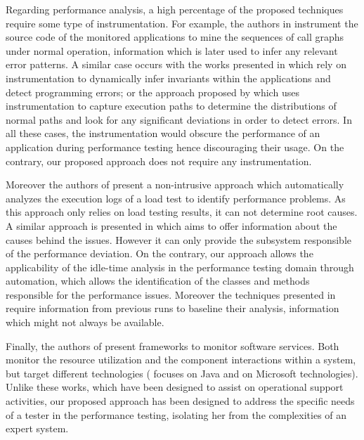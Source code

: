\documentclass[runningheads,a4paper]{llncs}
\begin{document}
Regarding performance analysis, a high percentage of the proposed
techniques require some type of instrumentation. For example, the authors in
\cite{Yang1} instrument the source code of the monitored applications to mine
the sequences of call graphs under normal operation, information which is
later used to infer any relevant error patterns. A similar case occurs with
the works presented in \cite{Hangal1,Csallner1} which rely on instrumentation to dynamically 
infer invariants within the applications and detect programming errors; or the
approach proposed by \cite{Chen2} which uses instrumentation to capture execution paths to determine
the distributions of normal paths and look for any significant deviations in
order to detect errors. In all these cases, the instrumentation would obscure
the performance of an application during performance testing hence discouraging
their usage. On the contrary, our proposed approach does not require any
instrumentation.

Moreover the authors of \cite{Jiang2009} present a non-intrusive approach which
automatically analyzes the execution logs of a load test to identify performance
problems. As this approach only relies on load testing results, it can not
determine root causes. A similar approach is presented in \cite{Malik1} which
aims to offer information about the causes behind the issues. However it can
only provide the subsystem responsible of the performance deviation. On the
contrary, our approach allows the applicability of the idle-time analysis in the
performance testing domain through automation, which allows the identification
of the classes and methods responsible for the performance issues. Moreover the
techniques presented in \cite{Jiang2009,Malik1} require information from previous runs 
to baseline their analysis, information which might not always be available.

Finally, the authors of \cite{mon3,Barham1} present frameworks to
monitor software services. Both monitor the resource utilization and the
component interactions within a system, but target different technologies
(\cite{mon3} focuses on Java and \cite{Barham1} on Microsoft technologies).
Unlike these works, which have been designed to assist on operational support activities, 
our proposed approach has been designed to address the specific needs of a tester in the 
performance testing, isolating her from the complexities of an expert system.

\vspace{-7pt}
\end{document}
